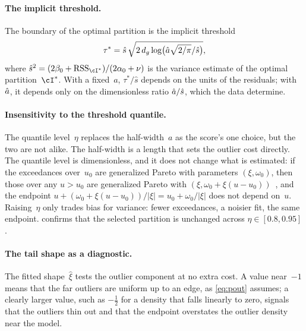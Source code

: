 \paragraph{The implicit threshold.}
The boundary of the optimal partition is the implicit
threshold~\cite{Pritts2026}
\begin{equation}
	\tau^* = \hat s\,\sqrt{2\,d_g\log\bigl(\hat a\sqrt{2/\pi}/\hat s\bigr)},
	\label{eq:implicit-threshold}
\end{equation}
where $\hat s^2 = (2\beta_0 + \RSS_{\cI^*})/(2\alpha_0 + \nu)$ is the
variance estimate of the optimal partition~$\cI^*$.  With a fixed~$a$,
$\tau^*/\hat s$ depends on the units of the residuals; with $\hat a$, it
depends only on the dimensionless ratio $\hat a/\hat s$, which the data
determine.

\paragraph{Insensitivity to the threshold quantile.}
The quantile level~$\eta$ replaces the half-width~$a$ as the score's one
choice, but the two are not alike.  The half-width is a length that sets
the outlier cost directly.  The quantile level is dimensionless, and it does
not change what is estimated: if the exceedances over~$u_0$ are generalized
Pareto with parameters $(\xi, \omega_0)$, then those over any $u > u_0$ are
generalized Pareto with $(\xi, \omega_0 + \xi(u - u_0))$~\cite{Coles2001},
and the endpoint $u + (\omega_0 + \xi(u - u_0))/|\xi| = u_0 + \omega_0/|\xi|$
does not depend on~$u$.  Raising~$\eta$ only trades bias for variance:
fewer exceedances, a noisier fit, the same endpoint.  
confirms that the selected partition is unchanged across
$\eta \in [0.8, 0.95]$.

\paragraph{The tail shape as a diagnostic.}
The fitted shape~$\hat\xi$ tests the outlier component at no extra cost.  A
value near~$-1$ means that the far outliers are uniform up to an edge, as
\cref{eq:pout} assumes; a clearly larger value, such as $-\tfrac12$ for a
density that falls linearly to zero, signals that the outliers thin out and
that the endpoint overstates the outlier density near the model.

